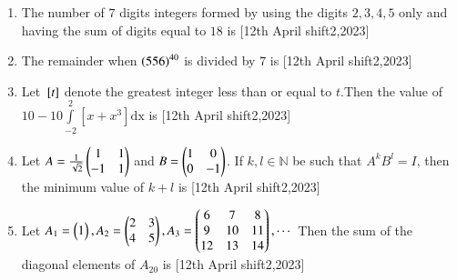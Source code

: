 \documentclass[journal]{IEEEtran}
\begin{document}
\begin{enumerate}[start=16]
\item The number of $7$ digits integers formed by using the digits $2,3,4,5$ only and having the sum of digits equal to $18$ is \underline{\hspace{1cm}} \hfill{[12th April shift2,2023]}\\

\item The remainder when $\left(556\right)^{40}$ is divided by $7$ is \underline{\hspace{1cm}} \hfill{[12th April shift2,2023]}\\

\item Let ${}\left[t\right]$ denote the greatest integer less than or equal to $t$.Then the value of $10-10\int\limits_{-2}^{2}{[x+x^3]}\text{dx}$ is \underline{\hspace{1cm}} \hfill{[12th April shift2,2023]}\\

\item Let $A=\frac{1}{\sqrt{2}}\begin{pmatrix}1&1\\-1&1\end{pmatrix}$ and $B=\begin{pmatrix}1&0\\0&-1\end{pmatrix}$. If $k, l \in \mathbb N$ be such that $A^{k}B^{l}=I$, then the minimum value of $k+l$ is \underline{\hspace{1cm}} \hfill{[12th April shift2,2023]}\\

\item Let $A_1=\begin{pmatrix}1\end{pmatrix}, A_2=\begin{pmatrix}2&3\\4&5\end{pmatrix},A_3=\begin{pmatrix}6&7&8\\9&10&11\\12&13&14\end{pmatrix},\cdots$ Then the sum of the diagonal elements of $A_{20}$ is \underline{\hspace{1cm}} \hfill{[12th April shift2,2023]}\\

\end{enumerate}
\end{document}
